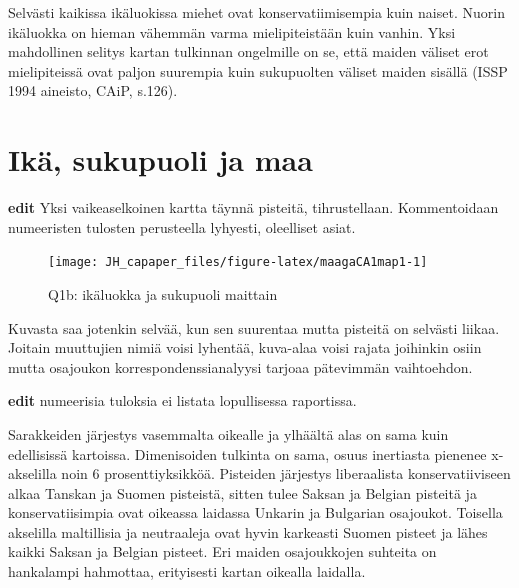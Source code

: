 \documentclass[
  finnish,
]{book}
\newenvironment{Shaded}{\begin{snugshade}}{\end{snugshade}}
\newcommand{\CommentTok}[1]{\textcolor[rgb]{0.56,0.35,0.01}{\textit{#1}}}
\newcommand{\DataTypeTok}[1]{\textcolor[rgb]{0.13,0.29,0.53}{#1}}
\newcommand{\KeywordTok}[1]{\textcolor[rgb]{0.13,0.29,0.53}{\textbf{#1}}}
\newcommand{\NormalTok}[1]{#1}
\newcommand{\StringTok}[1]{\textcolor[rgb]{0.31,0.60,0.02}{#1}}
\begin{document}
Selvästi kaikissa ikäluokissa miehet ovat konservatiimisempia kuin naiset.
Nuorin ikäluokka on hieman vähemmän varma mielipiteistään kuin vanhin.
Yksi mahdollinen selitys kartan tulkinnan ongelmille on se, että maiden väliset
erot mielipiteissä ovat paljon suurempia kuin sukupuolten väliset maiden sisällä
(ISSP 1994 aineisto, CAiP, s.126).

\hypertarget{ikuxe4-sukupuoli-ja-maa}{%
\section{Ikä, sukupuoli ja maa}\label{ikuxe4-sukupuoli-ja-maa}}

\textbf{edit} Yksi vaikeaselkoinen kartta täynnä pisteitä, tihrustellaan.
Kommentoidaan numeeristen tulosten perusteella lyhyesti, oleelliset asiat.

\begin{Shaded}
\end{Shaded}

\begin{figure}

{\centering \texttt{[image: JH\_capaper\_files/figure-latex/maagaCA1map1-1]} 

}

\caption{Q1b: ikäluokka ja sukupuoli maittain}\label{fig:maagaCA1map1}
\end{figure}

Kuvasta saa jotenkin selvää, kun sen suurentaa mutta pisteitä on selvästi liikaa.
Joitain muuttujien nimiä voisi lyhentää, kuva-alaa voisi rajata joihinkin osiin
mutta osajoukon korrespondenssianalyysi tarjoaa pätevimmän vaihtoehdon.

\textbf{edit} numeerisia tuloksia ei listata lopullisessa raportissa.

Sarakkeiden järjestys vasemmalta oikealle ja ylhäältä alas on sama kuin edellisissä
kartoissa. Dimenisoiden tulkinta on sama, osuus inertiasta pienenee x-akselilla
noin 6 prosenttiyksikköä. Pisteiden järjestys liberaalista konservatiiviseen
alkaa Tanskan ja Suomen pisteistä, sitten tulee Saksan ja Belgian pisteitä ja
konservatiisimpia ovat oikeassa laidassa Unkarin ja Bulgarian osajoukot. Toisella
akselilla maltillisia ja neutraaleja ovat hyvin karkeasti Suomen pisteet ja lähes
kaikki Saksan ja Belgian pisteet. Eri maiden osajoukkojen suhteita on hankalampi
hahmottaa, erityisesti kartan oikealla laidalla.
\end{document}
